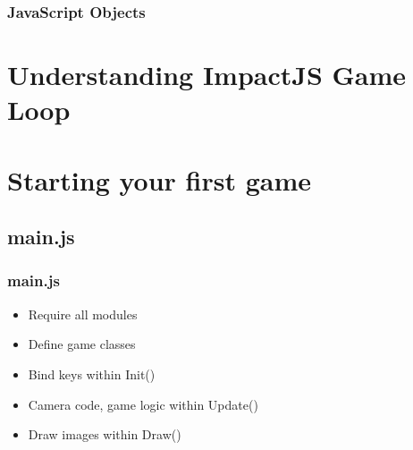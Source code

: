 \documentclass[red]{beamer}
\begin{document}
\begin{frame}
 	\frametitle{JavaScript Objects}
		\lstI
\end{frame}

\section{Understanding ImpactJS Game Loop}


\section{Starting your first game}
\subsection{main.js}
\begin{frame}
    \frametitle{main.js}
    \begin{itemize}
        \item<1-> Require all modules
        \item<2-> Define game classes
        \item<3-> Bind keys within Init()
        \item<4-> Camera code, game logic within Update()
        \item<5-> Draw images within Draw()
    \end{itemize}
\end{frame}
\end{document}
